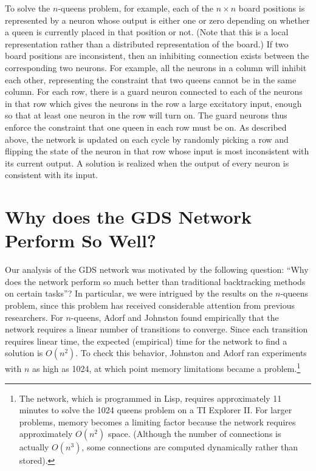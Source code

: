 \documentclass[twoside,12pt,titlepage,a4paper]{article}
\begin{document}
  To solve the $n$-queens problem, for example, each of the $n \times n$ board
positions is represented by a neuron whose output is either one or
zero depending on whether a queen is currently placed in that position
or not.  (Note that this is a local representation rather than a
distributed representation of the board.)  If two board positions are
inconsistent, then an inhibiting connection exists between the
corresponding two neurons.  For example, all the neurons in a column
will inhibit each other, representing the constraint that two queens
cannot be in the same column.  For each row, there is a guard neuron
connected to each of the neurons in that row which gives the neurons
in the row a large excitatory input, enough so that at least one
neuron in the row will turn on.  The guard neurons thus enforce the
constraint that one queen in each row must be on.  As described above,
the network is updated on each cycle by randomly picking a row and
flipping the state of the neuron in that row whose input is most
inconsistent with its current output. A solution is realized when the
output of every neuron is consistent with its input.

\section{Why does the GDS Network Perform So Well?}
\label{mv-heuristic}

Our analysis of the GDS network was motivated by the following question:
``Why does the network perform so much better than traditional backtracking
methods on certain tasks''? In particular, we were intrigued by the results
on the $n$-queens problem, since this problem has received considerable
attention from previous researchers.  For $n$-queens, Adorf and Johnston
found empirically that the network requires a linear number of transitions to
converge. Since each transition requires linear time, the expected
(empirical) time for the network to find a solution is $O(n^2)$. To check
this behavior, Johnston and Adorf ran experiments with $n$ as high as 1024,
at which point memory limitations became a problem.\footnote{The network,
which is programmed in Lisp, requires approximately 11 minutes to solve the
1024 queens problem on a TI Explorer II. For larger problems, memory becomes
a limiting factor because the network requires approximately $O(n^{2})$
space.  (Although the number of connections is actually $O(n^{3})$, some
connections are computed dynamically rather than stored).}
\end{document}
